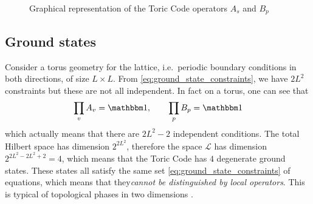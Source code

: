 \begin{figure}[t]
    \centering
    
    \caption{Graphical representation of the Toric Code operators $A_s$ and $B_p$}
\end{figure}

\subsection{Ground states}
\label{sub:ground_states}


Consider a torus geometry for the lattice, i.e.~periodic boundary conditions in both directions, of size $L \times L$.
From \eqref{eq:ground_state_constraints}, we have $2L^2$ constraints but these are not all independent.
In fact on a torus, one can see that
\begin{equation}
    \prod_{v} A_{v} = \One, \qquad
    \prod_{p} B_p = \One
\end{equation}
which actually means that there are $2L^2 - 2$ independent conditions.
The total Hilbert space has dimension $2^{2L^2}$, therefore the space $\mathcal{L}$ has dimension $2^{2L^2 - 2L^2 + 2} = 4$, which means that the Toric Code has $4$ degenerate ground states.
These states all satisfy the same set \eqref{eq:ground_state_constraints} of equations, which means that they\emph{cannot be distinguished by local operators}.
This is typical of topological phases in two dimensions .

